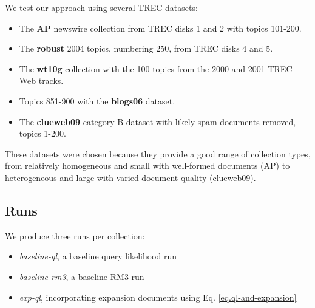 \documentclass{report}
\begin{document}
We test our approach using several TREC datasets:
\begin{itemize}
	\item The \textbf{AP} newswire collection from TREC disks 1 and 2 with topics 101-200.
	\item The \textbf{robust} 2004 topics, numbering 250, from TREC disks 4 and 5.
	\item The \textbf{wt10g} collection with the 100 topics from the 2000 and 2001 TREC Web tracks.
	\item Topics 851-900 with the \textbf{blogs06} dataset.
	\item The \textbf{clueweb09} category B dataset with likely spam documents removed, topics 1-200.
\end{itemize}

These datasets were chosen because they provide a good range of collection types, from relatively homogeneous and small with well-formed documents (AP) to heterogeneous and large with varied document quality (clueweb09).


\subsection{Runs}\label{section.evaluation.runs}


We produce three runs per collection:
\begin{itemize}
	\item \textit{baseline-ql}, a baseline query likelihood run
	\item \textit{baseline-rm3}, a baseline RM3 run
	\item \textit{exp-ql}, incorporating expansion documents using Eq. \ref{eq.ql-and-expansion}
\end{itemize}
\end{document}
